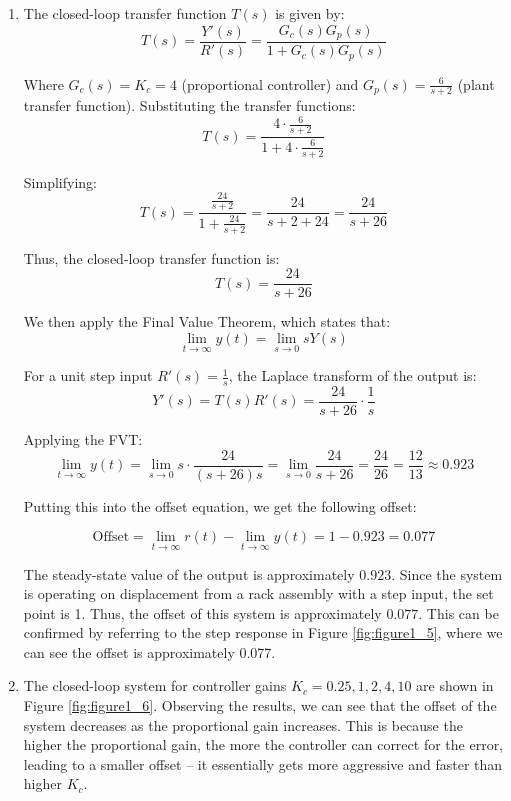 \documentclass[12pt]{article}
\begin{document}
\begin{enumerate}
\begin{enumerate}
    \item
    The closed-loop transfer function \( T(s) \) is given by:
    \[
    T(s) = \frac{Y'(s)}{R'(s)} = \frac{G_c(s)G_p(s)}{1 + G_c(s)G_p(s)}
    \]

    Where \( G_c(s) = K_c = 4 \) (proportional controller) and \( G_p(s) = \frac{6}{s+2} \) (plant transfer function). Substituting the transfer functions:
    \[
    T(s) = \frac{4 \cdot \frac{6}{s+2}}{1 + 4 \cdot \frac{6}{s+2}}
    \]

    Simplifying:
    \[
    T(s) = \frac{\frac{24}{s+2}}{1 + \frac{24}{s+2}} = \frac{24}{s+2+24} = \frac{24}{s+26}
    \]

    Thus, the closed-loop transfer function is:
    \[
    T(s) = \frac{24}{s+26}
    \]

    We then apply the Final Value Theorem, which states that:
    \[
    \lim_{t \to \infty} y(t) = \lim_{s \to 0} sY(s)
    \]

    For a unit step input \( R'(s) = \frac{1}{s} \), the Laplace transform of the output is:
    \[
    Y'(s) = T(s)R'(s) = \frac{24}{s+26} \cdot \frac{1}{s}
    \]

    Applying the FVT:
    \[
    \lim_{t \to \infty} y(t) = \lim_{s \to 0} s \cdot \frac{24}{(s+26)s} = \lim_{s \to 0} \frac{24}{s+26} = \frac{24}{26} = \frac{12}{13} \approx 0.923
    \]

    Putting this into the offset equation, we get the following offset:

    \[
    \text{Offset} = \lim_{t \to \infty} r(t) - \lim_{t \to \infty} y(t) = 1 - 0.923 = 0.077
    \]

    The steady-state value of the output is approximately \( 0.923 \). Since the system is operating on displacement from a rack assembly with a step input, the set point is 1. Thus, the offset of this system is approximately \( 0.077 \). This can be confirmed by referring to the step response in Figure \ref{fig:figure1_5}, where we can see the offset is approximately 0.077.

    \pagebreak

    \item
    The closed-loop system for controller gains $K_c = {0.25, 1, 2, 4, 10}$ are shown in Figure \ref{fig:figure1_6}. Observing the results, we can see that the offset of the system decreases as the proportional gain increases. This is because the higher the proportional gain, the more the controller can correct for the error, leading to a smaller offset -- it essentially gets more aggressive and faster than higher $K_c$.


\end{enumerate}
\end{enumerate}
\end{document}
